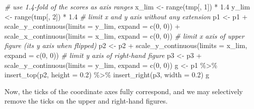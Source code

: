 \documentclass[
]{book}
\newenvironment{Shaded}{\begin{snugshade}}{\end{snugshade}}
\newcommand{\AttributeTok}[1]{\textcolor[rgb]{0.77,0.63,0.00}{#1}}
\newcommand{\CommentTok}[1]{\textcolor[rgb]{0.56,0.35,0.01}{\textit{#1}}}
\newcommand{\DecValTok}[1]{\textcolor[rgb]{0.00,0.00,0.81}{#1}}
\newcommand{\FloatTok}[1]{\textcolor[rgb]{0.00,0.00,0.81}{#1}}
\newcommand{\FunctionTok}[1]{\textcolor[rgb]{0.00,0.00,0.00}{#1}}
\newcommand{\NormalTok}[1]{#1}
\newcommand{\OtherTok}[1]{\textcolor[rgb]{0.56,0.35,0.01}{#1}}
\newcommand{\SpecialCharTok}[1]{\textcolor[rgb]{0.00,0.00,0.00}{#1}}
\begin{document}
\begin{Shaded}
\begin{Highlighting}[]
\CommentTok{\# use 1.4{-}fold of the scores as axis ranges}
\NormalTok{x\_lim }\OtherTok{\textless{}{-}} \FunctionTok{range}\NormalTok{(tmp[, }\DecValTok{1}\NormalTok{]) }\SpecialCharTok{*} \FloatTok{1.4}
\NormalTok{y\_lim }\OtherTok{\textless{}{-}} \FunctionTok{range}\NormalTok{(tmp[, }\DecValTok{2}\NormalTok{]) }\SpecialCharTok{*} \FloatTok{1.4}
\CommentTok{\# limit x and y axis without any extension}
\NormalTok{p1 }\OtherTok{\textless{}{-}}\NormalTok{ p1 }\SpecialCharTok{+} \FunctionTok{scale\_y\_continuous}\NormalTok{(}\AttributeTok{limits =}\NormalTok{ y\_lim, }\AttributeTok{expand =} \FunctionTok{c}\NormalTok{(}\DecValTok{0}\NormalTok{, }\DecValTok{0}\NormalTok{)) }\SpecialCharTok{+} 
    \FunctionTok{scale\_x\_continuous}\NormalTok{(}\AttributeTok{limits =}\NormalTok{ x\_lim, }\AttributeTok{expand =} \FunctionTok{c}\NormalTok{(}\DecValTok{0}\NormalTok{, }\DecValTok{0}\NormalTok{))}
\CommentTok{\# limit x axis of upper figure (it\textquotesingle{}s y axis when flipped)}
\NormalTok{p2 }\OtherTok{\textless{}{-}}\NormalTok{ p2 }\SpecialCharTok{+} \FunctionTok{scale\_y\_continuous}\NormalTok{(}\AttributeTok{limits =}\NormalTok{ x\_lim, }\AttributeTok{expand =} \FunctionTok{c}\NormalTok{(}\DecValTok{0}\NormalTok{, }\DecValTok{0}\NormalTok{))}
\CommentTok{\# limit y axis of right{-}hand figure}
\NormalTok{p3 }\OtherTok{\textless{}{-}}\NormalTok{ p3 }\SpecialCharTok{+} \FunctionTok{scale\_y\_continuous}\NormalTok{(}\AttributeTok{limits =}\NormalTok{ y\_lim, }\AttributeTok{expand =} \FunctionTok{c}\NormalTok{(}\DecValTok{0}\NormalTok{, }\DecValTok{0}\NormalTok{))}
\NormalTok{g }\OtherTok{\textless{}{-}}\NormalTok{ p1 }\SpecialCharTok{\%\textgreater{}\%} \FunctionTok{insert\_top}\NormalTok{(p2, }\AttributeTok{height =} \FloatTok{0.2}\NormalTok{) }\SpecialCharTok{\%\textgreater{}\%} \FunctionTok{insert\_right}\NormalTok{(p3, }\AttributeTok{width =} \FloatTok{0.2}\NormalTok{)}
\NormalTok{g}
\end{Highlighting}
\end{Shaded}

Now, the ticks of the coordinate axes fully correspond, and we may selectively remove the ticks on the upper and right-hand figures.
\end{document}

